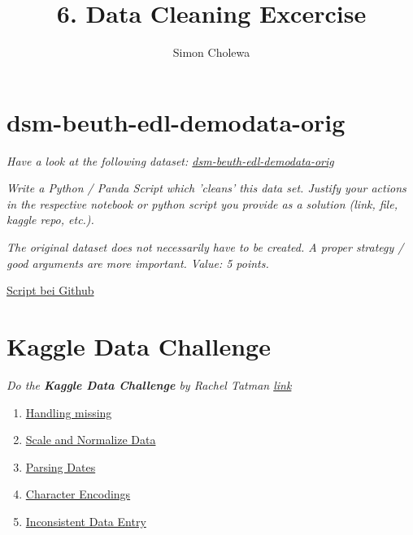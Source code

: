 \documentclass[11pt,a4paper]{article}
\author{Simon Cholewa}
\title{6. Data Cleaning Excercise}
\begin{document}
\maketitle

\section{dsm-beuth-edl-demodata-orig}

\textit{Have a look at the following dataset: \hyperref{https://github.com/edlich/eternalrepo/blob/master/DS-WAHLFACH/dsm-beuth-edl-demodata-dirty.csv}{}{}{dsm-beuth-edl-demodata-orig}}

\textit{Write a Python / Panda Script which 'cleans' this data set. Justify your actions in the respective notebook or python script you provide as a solution (link, file, kaggle repo, etc.).}

\textit{The original dataset does not necessarily have to be created. A proper strategy / good arguments are more important. Value: 5 points.}

\hyperref{https://raw.githubusercontent.com/grutzwurst/Data_Science/EA_06/EA_06/scripts/aufgabe1.py}{}{}{Script bei Github}




\section{Kaggle Data Challenge}

\textit{Do the \textbf{Kaggle Data Challenge} by Rachel Tatman \hyperref{https://mailchi.mp/kaggle.com/5-day-data-challenge-data-cleaning-day-1?e=08afe8bf5d}{}{}{link}}

\begin{enumerate}
	\item \hyperref{https://www.kaggle.com/simoncholewa/data-cleaning-challenge-handling-missing-v-71e48a}{}{}{Handling missing}
	\item \hyperref{https://www.kaggle.com/simoncholewa/data-cleaning-challenge-scale-and-normalize-data}{}{}{Scale and Normalize Data}
	\item \hyperref{https://www.kaggle.com/simoncholewa/data-cleaning-challenge-parsing-dates}{}{}{Parsing Dates}
	\item \hyperref{https://www.kaggle.com/simoncholewa/data-cleaning-challenge-character-encodings}{}{}{Character Encodings}
	\item \hyperref{URL}{}{}{Inconsistent Data Entry}
\end{enumerate}
\end{document}
